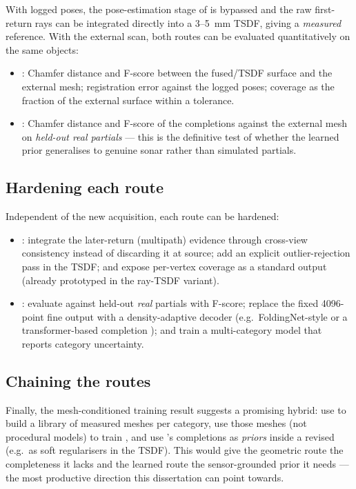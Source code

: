 With logged poses, the pose-estimation stage of \routeA{} is bypassed and the
raw first-return rays can be integrated directly into a 3--5~mm TSDF, giving a
\emph{measured} reference. With the external scan, both routes can be
evaluated quantitatively on the same objects:

\begin{itemize}
  \item \routeA{}: Chamfer distance and F-score between the fused/TSDF surface
  and the external mesh; registration error against the logged poses; coverage
  as the fraction of the external surface within a tolerance.
  \item \routeB{}: Chamfer distance and F-score of the completions against the
  external mesh on \emph{held-out real partials} --- this is the definitive
  test of whether the learned prior generalises to genuine sonar rather than
  simulated partials.
\end{itemize}

\subsection{Hardening each route}
Independent of the new acquisition, each route can be hardened:

\begin{itemize}
  \item \routeA{}: integrate the later-return (multipath) evidence through
  cross-view consistency instead of discarding it at source; add an explicit
  outlier-rejection pass in the TSDF; and expose per-vertex coverage as a
  standard output (already prototyped in the ray-TSDF variant).
  \item \routeB{}: evaluate against held-out \emph{real} partials with
  F-score; replace the fixed 4096-point fine output with a
  density-adaptive decoder (e.g.\ FoldingNet-style
  \citep{yang2018folding} or a transformer-based completion
  \citep{xie2020pointr}); and train a multi-category model that reports
  category uncertainty.
\end{itemize}

\subsection{Chaining the routes}
Finally, the mesh-conditioned training result suggests a promising hybrid:
use \routeA{} to build a library of measured meshes per category, use those
meshes (not procedural models) to train \routeB{}, and use \routeB{}'s
completions as \emph{priors} inside a revised \routeA{} (e.g.\ as soft
regularisers in the TSDF). This would give the geometric route the
completeness it lacks and the learned route the sensor-grounded prior it
needs --- the most productive direction this dissertation can point towards.

